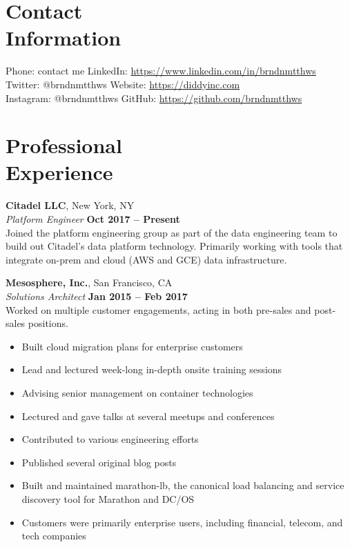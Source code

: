 \documentclass[margin,line]{resume}
\begin{document}
\begin{resume}
    \section{\mysidestyle Contact\\Information}

    Phone: contact me                  \hfill LinkedIn: \url{https://www.linkedin.com/in/brndnmtthws} \\
    \noindent Twitter: @brndnmtthws    \hfill Website: \url{https://diddyinc.com} \\
    \noindent Instagram: @brndnmtthws  \hfill GitHub: \url{https://github.com/brndnmtthws}\vspace{0mm}\\\vspace{-4.5mm}

    \section{\mysidestyle Professional\\Experience}

    \textbf{Citadel LLC}, New York, NY \vspace{2mm}\\\vspace{1mm}%
    \textsl{Platform Engineer} \hfill \textbf{Oct 2017 -- Present}\\
    Joined the platform engineering group as part of the data engineering
    team to build out Citadel's data platform technology. Primarily working
    with tools that integrate on-prem and cloud (AWS and GCE) data
    infrastructure.

    \textbf{Mesosphere, Inc.}, San Francisco, CA \vspace{2mm}\\\vspace{1mm}%
    \textsl{Solutions Architect} \hfill \textbf{Jan 2015 -- Feb 2017}\\
    Worked on multiple customer engagements, acting in both pre-sales and
    post-sales positions.

    \begin{itemize}
    \item Built cloud migration plans for enterprise customers
    \item Lead and lectured week-long in-depth onsite training sessions
    \item Advising senior management on container technologies
    \item Lectured and gave talks at several meetups and conferences
    \item Contributed to various engineering efforts
    \item Published several original blog posts
    \item Built and maintained marathon-lb, the canonical load balancing and
     service discovery tool for Marathon and DC/OS
    \item Customers were primarily enterprise users, including financial,
     telecom, and tech companies
    \end{itemize}


\end{resume}
\end{document}

